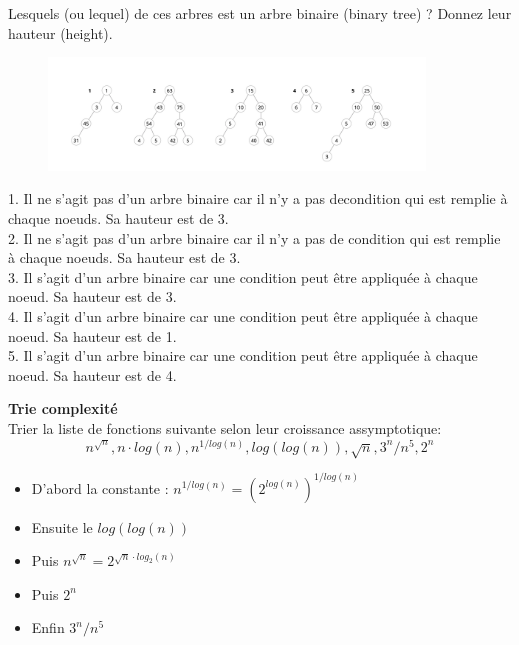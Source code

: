 \begin{Exercice}
	Lesquels (ou lequel) de ces arbres est un arbre binaire (binary tree) ? Donnez leur hauteur (height).
	\begin{figure}[h!]
        		\centering
       	 	\includegraphics[width=10cm]{resources/exercice5.png}
    	\end{figure}
	\begin{solution}
		1. Il ne s'agit pas d'un arbre binaire car il n'y a pas decondition qui est remplie à chaque noeuds. Sa hauteur est de 3.\\
		2. Il ne s'agit pas d'un arbre binaire car il n'y a pas de condition qui est remplie à chaque noeuds. Sa hauteur est de 3.\\
		3. Il s'agit d'un arbre binaire car une condition peut être appliquée à chaque noeud. Sa hauteur est de 3.\\
		4. Il s'agit d'un arbre binaire car une condition peut être appliquée à chaque noeud. Sa hauteur est de 1.\\
		5. Il s'agit d'un arbre binaire car une condition peut être appliquée à chaque noeud. Sa hauteur est de 4.\\
	\end{solution}
\end{Exercice}


\begin{Exercice}[10 minutes]\textbf{Trie complexité}\\
	Trier la liste de fonctions suivante selon leur croissance assymptotique:
	\begin{equation}
		n^{\sqrt{n}}, n\cdot log(n), n^{1/log(n)}, log(log(n)), \sqrt{n}, 3^{n}/{n^5}, 2^n
	\end{equation}
	
	\begin{solution}
		\begin{itemize}
			\item D'abord la constante : $n^{1/log(n)} = (2^{log(n)})^{1/log(n)}$
			\item Ensuite le $log(log(n))$
			\item Puis $n^{\sqrt{n}} = 2^{\sqrt{n}\cdot log_2(n)}$
			\item Puis $2^n$
			\item Enfin  $3^{n}/{n^5}$
		\end{itemize}
	\end{solution}
\end{Exercice}



